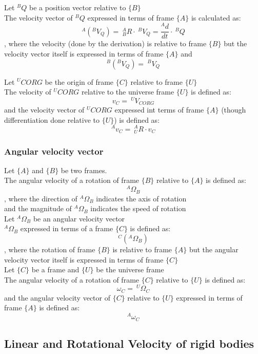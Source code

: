 \documentclass[10pt,a4paper]{article}
\begin{document}
Let $^BQ$ be a position vector relative to $\{B\}$ \\
The velocity vector of $^BQ$ expressed in terms of frame $\{A\}$ is calculated as:
$$
	^A(^BV_Q) = ~^A_BR ⋅ ~^BV_Q = \frac{^Ad}{dt}⋅ ~^BQ
$$, where the velocity (done by the derivation) is relative to frame $\{B\}$ but the velocity vector itself is expressed in terms of frame $\{A\}$ and
$$
	^B(^BV_Q) = ~^BV_Q
$$

Let $^UCORG$ be the origin of frame $\{C\}$ relative to frame $\{U\}$ \\
The velocity of $^UCORG$ relative to the universe frame $\{U\}$ is defined as:
$$
	v_C = ~^UV_{CORG}
$$
and the velocity vector of $^UCORG$ expressed int terms of frame $\{A\}$ (though differentiation done relative to $\{U\}$) is defined as:
$$
	^Av_C = ~^A_UR ⋅ v_C
$$

\subsubsection{Angular velocity vector}
Let $\{A\}$ and $\{B\}$ be two frames. \\
The angular velocity of a rotation of frame $\{B\}$ relative to $\{A\}$ is defined as:
$$
^A\Omega_B
$$
, where the direction of $^A\Omega_B$ indicates the axis of rotation \\
and the magnitude of $^A\Omega_B$ indicates the speed of rotation \\

Let $^A\Omega_B$ be an angular velocity vector \\
$^A\Omega_B$ expressed in terms of a frame $\{C\}$ is defined as:
$$
^C(^A\Omega_B)
$$, where the rotation of frame $\{B\}$ is relative to frame $\{A\}$ but the angular velocity vector itself is expressed in terms of frame $\{C\}$ \\

Let $\{C\}$ be a frame and $\{U\}$ be the universe frame \\
The angular velocity of a rotation of frame $\{C\}$ relative to $\{U\}$ is defined as:
$$
\omega_C = ~^U\Omega_{C}
$$
and the angular velocity vector of $\{C\}$ relative to $\{U\}$ expressed in terms of frame $\{A\}$ is defined as:
$$
^A\omega_C
$$

\subsection{Linear and Rotational Velocity of rigid bodies}
\end{document}
